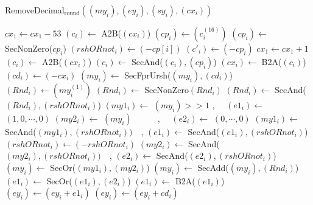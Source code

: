 \documentclass[runningheads]{llncs}
\begin{document}
\begin{algorithm}
  \caption{RemoveDecimal$_{\text{round}}((my_i), (ey_i), (sy_i), (cx_i))$}
  $cx_1 \leftarrow cx_1 - 53$
  $(c_i) \leftarrow$ A2B($(cx_i)$)\;
  $(cp_i) \leftarrow (c_i^{(16)})$\;
  $(cp_i) \leftarrow$ SecNonZero($cp_i$)\;
  $(rshORnot_i) \leftarrow (-cp[i])$\; 
  $(c'_i) \leftarrow (- cp_i)$
  $cx_1 \leftarrow cx_1 + 1$\;
  $(c_i) \leftarrow$ A2B($(cx_i)$)\;
  $(c_i) \leftarrow$ SecAnd($(c_i), (cp_i)$)\;
  $(cx_i) \leftarrow$ B2A($(c_i)$)\;
  $(cd_i) \leftarrow (-cx_i)$\;
  $(my_i) \leftarrow$ SecFprUrsh($(my_i), (cd_i)$)
  $(Rnd_i) \leftarrow (my_i^{(1)})$\;
  $(Rnd_i) \leftarrow$ SecNonZero$(Rnd_i)$\;
  $(Rnd_i) \leftarrow$ SecAnd($(Rnd_i), (rshORnot_i)$)\;
  $(my1_i) \leftarrow$ $(my_i)>>1$ , $\quad (e1_i) \leftarrow$ $(1,0,\cdots, 0)$\;
  $(my2_i) \leftarrow$ $(my_i)\qquad \quad$,  $\quad(e2_i) \leftarrow$ $(0,\cdots, 0)$\;
  $(my1_i) \leftarrow$ SecAnd($(my1_i), (rshORnot_i))\quad $, $(e1_i) \leftarrow$ SecAnd($(e1_i), (rshORnot_i)$)\;
  $(rshORnot_i) \leftarrow (-rshORnot_i)$\;
  $(my2_i) \leftarrow$ SecAnd($(my2_i), (rshORnot_i))\quad $, $(e2_i) \leftarrow$ SecAnd($(e2_i), (rshORnot_i)$)\;
  $(my_i) \leftarrow$ SecOr($(my1_i), (my2_i)$)\;
  $(my_i) \leftarrow$ SecAdd($(my_i), (Rnd_i)$)\;
  $(e1_i) \leftarrow$ SecOr($(e1_i), (e2_i)$)\;
  $(e1_i) \leftarrow$ B2A($(e1_i)$)\; 
  $(ey_i) \leftarrow (ey_i + e1_i) $\;
  $(ey_i) \leftarrow (ey_i + cd_i)$\; 
\;
\end{algorithm}
\end{document}
